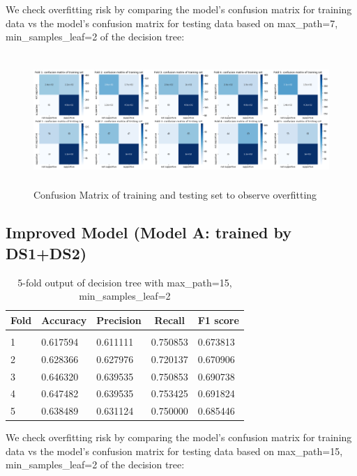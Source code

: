 \documentclass{article} %
\begin{document}
We check overfitting risk by comparing the model's confusion matrix for training data vs the model's confusion matrix for testing data based on max\_path=7, min\_samples\_leaf=2 of the decision tree:

\begin{figure}[H]
	\includegraphics[height=5cm, width=17cm]{5.png}
	\caption{Confusion Matrix of training and testing set to observe overfitting}
\end{figure}



\subsection{Improved Model (Model A: trained by DS1+DS2)}

\begin{table}[H]
	\caption{5-fold output of decision tree with max\_path=15, min\_samples\_leaf=2}
	\label{sample-table}
	\begin{center}
		\begin{tabular}{|l|l|l|l|l|}
			\multicolumn{1}{c}{\bf Fold}  
			&\multicolumn{1}{c}{\bf Accuracy}
			&\multicolumn{1}{c}{\bf Precision} 
			&\multicolumn{1}{c}{\bf Recall}
			&\multicolumn{1}{c}{\bf F1 score}
			\\ \hline & & & & \\
			1        &0.617594	&0.611111	&0.750853	&0.673813 \\
			2        &0.628366	&0.627976	&0.720137	&0.670906 \\
			3        &0.646320	&0.639535	&0.750853	&0.690738 \\
			4        &0.647482	&0.639535	&0.753425	&0.691824 \\
			5        &0.638489	&0.631124	&0.750000	&0.685446 \\
			\hline
		\end{tabular}
	\end{center}
\end{table}

We check overfitting risk by comparing the model's confusion matrix for training data vs the model's confusion matrix for testing data based on max\_path=15, min\_samples\_leaf=2 of the decision tree:
\end{document}
